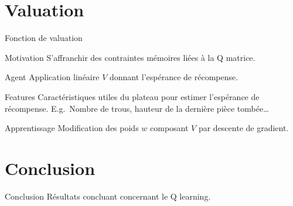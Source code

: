 \documentclass[tikz, footheight=2em]{beamer}
\begin{document}
\section{Valuation}
\begin{frame}[c]{Fonction de valuation}
  \begin{block}{Motivation}
    S'affranchir des contraintes mémoires liées à la Q matrice.
  \end{block}
  \pause{}
  \begin{block}{Agent}
    Application linéaire \(V\) donnant l'espérance de récompense.
  \end{block}
  \pause{}
  \begin{exampleblock}{Features}
    Caractéristiques utiles du plateau pour estimer l'espérance de récompense.
    E.g.\ Nombre de trous, hauteur de la dernière pièce tombée\dots
  \end{exampleblock}
  \pause{}
  \begin{block}{Apprentissage}
    Modification des poids \(w\) composant \(V\) par descente de gradient.
  \end{block}
\end{frame}

\section*{Conclusion}
\begin{frame}[c]{Conclusion}
  Résultats concluant concernant le Q learning.
\end{frame}
\end{document}
